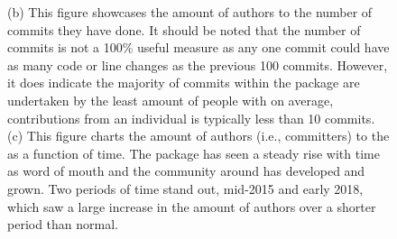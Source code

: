 \begin{figure}
{	(b) This figure showcases the amount of authors to the number of commits they have done.
	It should be noted that the number of commits is not a 100\% useful measure as any one commit could have as many code or line changes as the previous 100 commits.
	However, it does indicate the majority of commits within the package are undertaken by the least amount of people with on average, contributions from an individual is typically less than 10 commits.
	(c) This figure charts the amount of authors (i.e., committers) to the \sunpypkg as a function of time.
	The package has seen a steady rise with time as word of mouth and the community around \sunpy has developed and grown.
	Two periods of time stand out, mid-2015 and early 2018, which saw a large increase in the amount of authors over a shorter period than normal.
}
\label{fig:metafig}
\end{figure}
